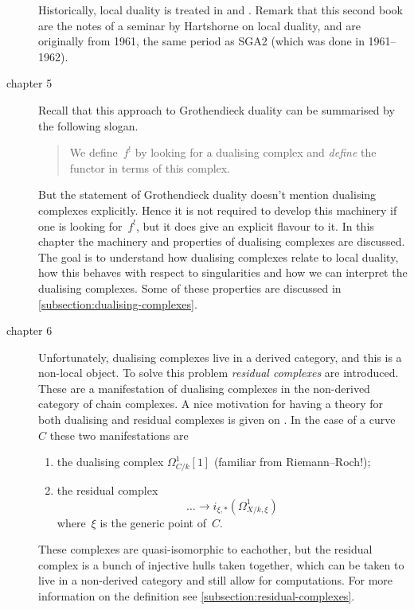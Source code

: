 \documentclass[10pt,a4paper]{article}
\begin{document}
\begin{description}
    Historically, local duality is treated in \cite{sga2} and \cite{hartshorne-local-cohomology}. Remark that this second book are the notes of a seminar by Hartshorne on local duality, and are originally from 1961, the same period as SGA2 (which was done in 1961--1962).

  \item[chapter 5] Recall that this approach to Grothendieck duality can be summarised by the following slogan.
    \begin{quote}
      We define~$f^!$ by looking for a dualising complex and \emph{define} the functor in terms of this complex.
    \end{quote}
    But the statement of Grothendieck duality doesn't mention dualising complexes explicitly. Hence it is not required to develop this machinery if one is looking for~$f^!$, but it does give an explicit flavour to it. In this chapter the machinery and properties of dualising complexes are discussed. The goal is to understand how dualising complexes relate to local duality, how this behaves with respect to singularities and how we can interpret the dualising complexes. Some of these properties are discussed in \cref{subsection:dualising-complexes}.

  \item[chapter 6] Unfortunately, dualising complexes live in a derived category, and this is a non-local object\addreference. To solve this problem \emph{residual complexes} are introduced. These are a manifestation of dualising complexes in the non-derived category of chain complexes. A nice motivation for having a theory for both dualising and residual complexes is given on \cite[pages 106--107]{conrad-grothendieck-duality-and-base-change}. In the case of a curve~$C$ these two manifestations are
    \begin{enumerate}
      \item the dualising complex $\Omega_{C/k}^1[1]$ (familiar from Riemann--Roch!);
      \item the residual complex
        \begin{equation}
          \dotso\to i_{\xi,*}\left( \Omega_{X/k,\xi}^1 \right)
        \end{equation}
        where~$\xi$ is the generic point of~$C$.
    \end{enumerate}
    These complexes are quasi-isomorphic to eachother, but the residual complex is a bunch of injective hulls taken together, which can be taken to live in a non-derived category and still allow for computations. For more information on the definition see \cref{subsection:residual-complexes}.


\end{description}
\end{document}
